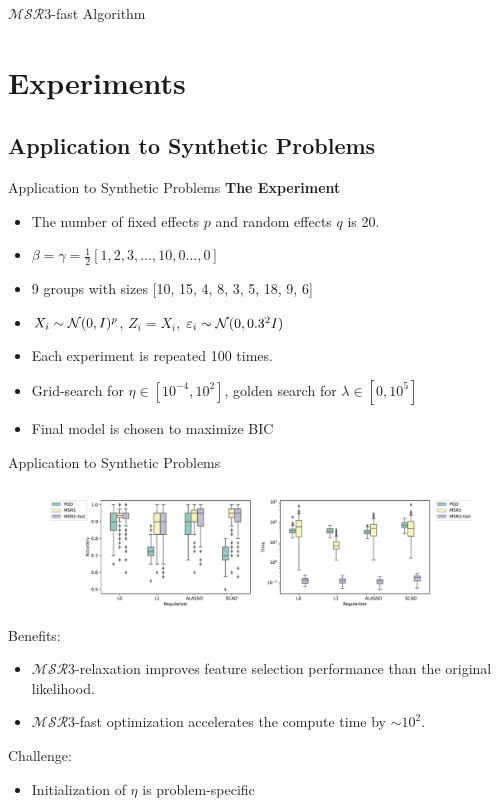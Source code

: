 \documentclass[8pt]{beamer}
\newcommand{\ouralgo}{\ensuremath{\mathcal{MSR}3}}
\begin{document}
\begin{frame}{$\ouralgo$-fast Algorithm}

\end{frame}

\section{Experiments}
\subsection{Application to Synthetic Problems}

\begin{frame}{Application to Synthetic Problems}
\textbf{The Experiment} 
\begin{itemize}
	\item The number of fixed effects $p$ and random effects $q$ is 20.
	\item $\beta = \gamma = \frac{1}{2}[1,2,3,\dots,10, 0\dots,0]$
	\item 9 groups with sizes [10, 15, 4, 8, 3, 5, 18, 9, 6]
	\item $X_i \sim \operatorname{\mathcal{N}}(0, I)^p$, $Z_i = X_i$, $\varepsilon_i \sim \operatorname{\mathcal{N}}(0, 0.3^2I)$
	\item Each experiment is repeated 100 times.
	\item Grid-search for $\eta \in [10^{-4}, 10^{2}]$, golden search for $\lambda \in [0, 10^5]$
	\item Final model is chosen to maximize BIC
\end{itemize}
\begin{table}
	
\end{table}
\end{frame}

\begin{frame}{Application to Synthetic Problems}
\begin{figure}
	\includegraphics[width=\textwidth]{Figures/performance_picture_current.pdf}
\end{figure}
Benefits:
\begin{itemize}
	\item $\ouralgo$-relaxation improves feature selection performance than the original likelihood.
	\item $\ouralgo$-fast optimization accelerates the compute time by $\sim 10^2$.
\end{itemize}
Challenge:
   \begin{itemize}
   	\item Initialization of $\eta$ is problem-specific
   \end{itemize}
\end{frame}
\end{document}
